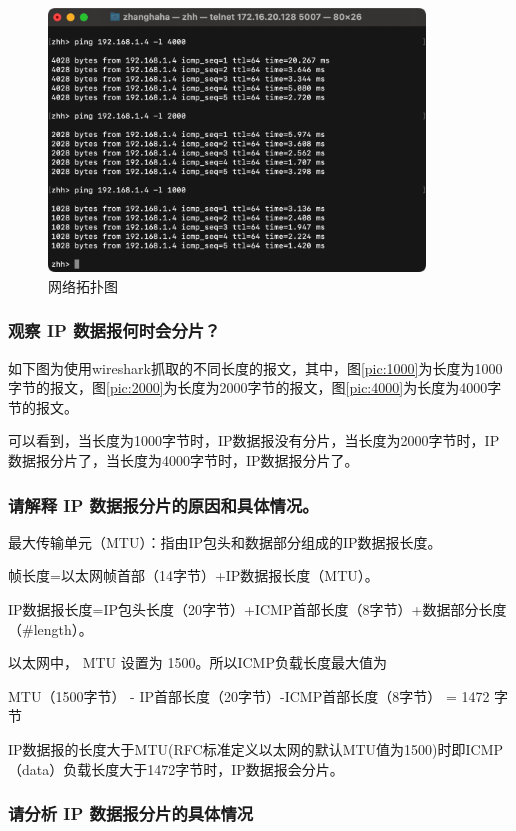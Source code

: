 \documentclass[a4paper,12pt]{report}
\begin{document}
\begin{spacing}{1.5}
\begin{figure}[htb!]
  \centering
\includegraphics[width=10cm]{figure/pingl.png}
\caption{网络拓扑图}
\label{pic:pingl}
\end{figure}


\subsubsection{观察 IP 数据报何时会分片？} 


如下图为使用wireshark抓取的不同长度的报文，其中，图\ref{pic:1000}为长度为1000字节的报文，图\ref{pic:2000}为长度为2000字节的报文，图\ref{pic:4000}为长度为4000字节的报文。

可以看到，当长度为1000字节时，IP数据报没有分片，当长度为2000字节时，IP数据报分片了，当长度为4000字节时，IP数据报分片了。


\subsubsection{请解释 IP 数据报分片的原因和具体情况。}

最大传输单元（MTU）：指由IP包头和数据部分组成的IP数据报长度。

帧长度=以太网帧首部（14字节）+IP数据报长度（MTU）。

IP数据报长度=IP包头长度（20字节）+ICMP首部长度（8字节）+数据部分长度（\#length）。

以太网中， MTU 设置为 1500。所以ICMP负载长度最大值为

MTU（1500字节） - IP首部长度（20字节）-ICMP首部长度（8字节） = 1472 字节

IP数据报的长度大于MTU(RFC标准定义以太网的默认MTU值为1500)时即ICMP（data）负载长度大于1472字节时，IP数据报会分片。

\subsubsection{请分析 IP 数据报分片的具体情况}


\end{spacing}
\end{document}
